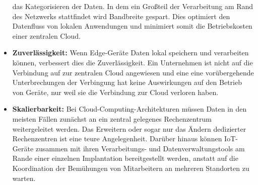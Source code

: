 \documentclass[runningheads]{llncs}
\numberwithin{figure}{section}
\begin{document}
\begin{itemize}
  das Kategorisieren der Daten. In dem ein Großteil der Verarbeitung am Rand des Netzwerks stattfindet wird Bandbreite gespart.
  Dies optimiert den Datenfluss von lokalen Anwendungen und minimiert somit die Betriebskosten einer zentralen Cloud.
  \item \textbf{Zuverlässigkeit:} Wenn Edge-Geräte Daten lokal speichern und verarbeiten können, verbessert dies die Zuverlässigkeit.
  Ein Unternehmen ist nicht auf die Verbindung auf zur zentralen Cloud angewiesen und eine eine vorübergehende Unterbrechungen der 
  Verbingung hat keine Auswirkungen auf den Betrieb von Geräte, nur weil sie die Verbindung zur Cloud verloren haben.
  \item \textbf{Skalierbarkeit:}
  Bei Cloud-Computing-Architekturen müssen Daten in den meisten Fällen zunächst an ein zentral gelegenes Rechenzentrum
  weitergeleitet werden. Das Erweitern oder sogar nur das Ändern dedizierter Rechenzentren ist eine teure Angelegenheit. 
  Darüber hinaus können IoT-Geräte zusammen mit ihren Verarbeitungs- und Datenverwaltungstools am Rande einer einzelnen 
  Implantation bereitgestellt werden, 
  anstatt auf die Koordination der Bemühungen von Mitarbeitern an mehreren Standorten zu warten.

\end{itemize}
\newpage
\end{document}
